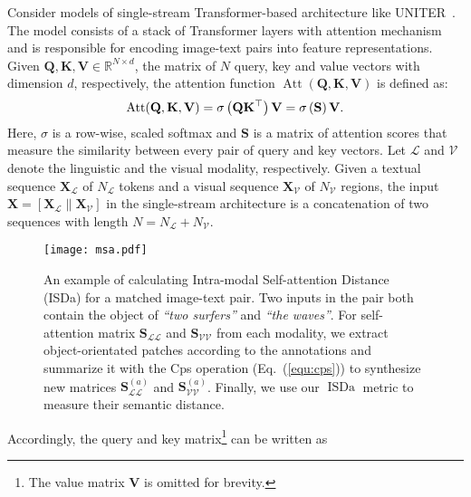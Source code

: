 \documentclass[11pt,a4paper]{article}
\begin{document}
Consider models of single-stream Transformer-based architecture like UNITER~\cite{UNITER}. 
The model consists of a stack of Transformer layers with attention mechanism~\cite{Attention-is-all-you-need} and is responsible for encoding image-text pairs into feature representations. 
Given $\mathbf{Q}, \mathbf{K}, \mathbf{V}\in \mathbb{R}^{N \times d}$, 
the matrix of $N$ query, key and value vectors with dimension $d$, respectively, the attention function $\operatorname{Att}(\mathbf{Q}, \mathbf{K}, \mathbf{V})$ is defined as: 
\begin{equation}
\small
    \operatorname{Att}(\mathbf{Q}, \mathbf{K}, \mathbf{V})=\sigma\left(\mathbf{Q} \mathbf{K}^{\top}\right) \mathbf{V}=\sigma\left(\mathbf{S}\right) \mathbf{V}.
\end{equation}
Here, $\sigma$ is a row-wise, scaled softmax and $\mathbf{S}$ is a matrix of attention scores that measure the similarity between every pair of query and key vectors.
Let $\mathcal{L}$ and $\mathcal{V}$ denote the linguistic and the visual modality, respectively. 
Given a textual sequence $\mathbf{X}_{\mathcal{L}}$ of $N_{\mathcal{L}}$ tokens and a visual sequence $\mathbf{X}_{\mathcal{V}}$ of $N_{\mathcal{V}}$ regions, the input $\mathbf{X}=\left[\mathbf{X}_{\mathcal{L}} \| \mathbf{X}_{\mathcal{V}}\right]$ in the single-stream architecture is a concatenation of two sequences with length $N=N_{\mathcal{L}}+N_{\mathcal{V}}$. 
\begin{figure}[t]
    \centering
    \texttt{[image: msa.pdf]}
    \caption{An example of calculating Intra-modal Self-attention Distance (ISDa) for a matched image-text pair. Two inputs in the pair both contain the object of \textit{``two surfers''} and \textit{``the waves''}. For self-attention matrix $\mathbf{S}_{\mathcal{LL}}$ and $\mathbf{S}_{\mathcal{VV}}$ from each modality, we extract object-orientated patches according to the annotations and summarize it with the Cps operation (Eq.~(\ref{equ:cps})) to 
  synthesize new matrices $\mathbf{S}_{\mathcal{LL}}^{(a)}$ and $\mathbf{S}_{\mathcal{VV}}^{(a)}$. Finally, we use our $\operatorname{ISDa}$ metric to measure their semantic distance.}
    \label{fig:msa}
\end{figure}
Accordingly, the query and key matrix\footnote{The value matrix $\mathbf{V}$ is omitted for brevity.} can be written as
\end{document}
